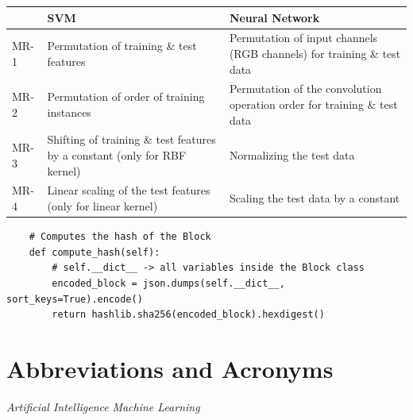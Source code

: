 \documentclass[12pt]{article}
\begin{document}
    \begin{table}[t]
        \centering
        \begin{tabular}{|C{.07\textwidth}|L{.41\textwidth}|L{.41\textwidth}|}
            \hline & \textbf{SVM} & \textbf{Neural Network} \\
            \hline MR-1 & Permutation of training \& test features & Permutation of input channels (RGB channels) for
training \& test data \\
            \hline MR-2 & Permutation of order of training instances & Permutation of the convolution operation order for
training \& test data \\
            \hline MR-3 & Shifting of training \& test features by a constant (only for RBF kernel) & Normalizing the test data \\
            \hline MR-4 & Linear scaling of the test features (only for linear kernel) & Scaling the test data by a constant \\
            \hline
        \end{tabular}

        \label{tab:relations}
    \end{table}

        \begin{center}
    \begin{lstlisting}
    # Computes the hash of the Block
    def compute_hash(self):
        # self.__dict__ -> all variables inside the Block class
        encoded_block = json.dumps(self.__dict__, sort_keys=True).encode()
        return hashlib.sha256(encoded_block).hexdigest()
    \end{lstlisting}
    \end{center}




\newpage

\section*{Abbreviations and Acronyms}
\begin{acronym}[Bash]
 {\textit{Artificial Intelligence}}
 {\textit{Machine Learning}}

\end{acronym}

\listoftables
\listoffigures


\end{document}
